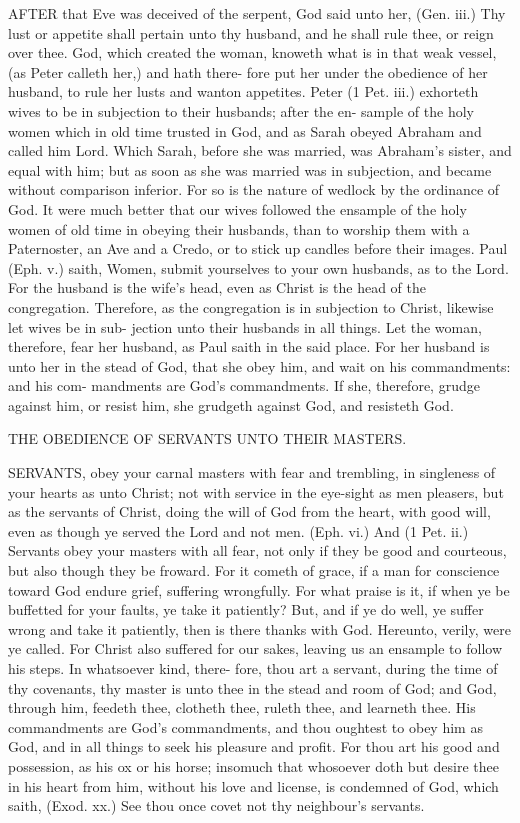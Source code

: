 \documentclass{custom}
\begin{document}
AFTER that Eve was deceived of the serpent, God said 
unto her, (Gen. iii.) Thy lust or appetite shall pertain 
unto thy husband, and he shall rule thee, or reign over
thee. God, which created the woman, knoweth what is
in that weak vessel, (as Peter calleth her,) and hath there- 
fore put her under the obedience of her husband, to rule her 
lusts and wanton appetites. Peter (1 Pet. iii.) exhorteth 
wives to be in subjection to their husbands; after the en- 
sample of the holy women which in old time trusted in 
God, and as Sarah obeyed Abraham and called him 
Lord. Which Sarah, before she was married, was
Abraham's sister, and equal with him; but as 
soon as she was married was in subjection, and became 
without comparison inferior. For so is the nature of 
wedlock by the ordinance of God. It were much better 
that our wives followed the ensample of the holy women of 
old time in obeying their husbands, than to worship them 
with a Paternoster, an Ave and a Credo, or to stick up 
candles before their images. Paul (Eph. v.) saith, Women, 
submit yourselves to your own husbands, as to the
Lord. For the husband is the wife's head, even as Christ is 
the head of the congregation. Therefore, as the congregation 
is in subjection to Christ, likewise let wives be in sub-
jection unto their husbands in all things. Let the woman, 
therefore, fear her husband, as Paul saith in the said place. 
For her husband is unto her in the stead of God, that she 
obey him, and wait on his commandments: and his com- 
mandments are God's commandments. If she, therefore, 
grudge against him, or resist him, she grudgeth against 
God, and resisteth God.


THE OBEDIENCE OF SERVANTS UNTO THEIR 
MASTERS. 

SERVANTS, obey your carnal masters with fear and 
trembling, in singleness of your hearts as unto Christ;
not with service in the eye-sight as men pleasers, but as 
the servants of Christ, doing the will of God from the 
heart, with good will, even as though ye served the Lord 
and not men. (Eph. vi.) And (1 Pet. ii.) Servants obey 
your masters with all fear, not only if they be good and 
courteous, but also though they be froward. For it cometh 
of grace, if a man for conscience toward God endure 
grief, suffering wrongfully. For what praise is it, if when 
ye be buffetted for your faults, ye take it patiently? But, 
and if ye do well, ye suffer wrong and take it patiently, 
then is there thanks with God. Hereunto, verily, were ye 
called. For Christ also suffered for our sakes, leaving us 
an ensample to follow his steps. In whatsoever kind, there- 
fore, thou art a servant, during the time of thy covenants, 
thy master is unto thee in the stead and room of God;
and God, through him, feedeth thee, clotheth thee, ruleth 
thee, and learneth thee. His commandments are God's 
commandments, and thou oughtest to obey him as God, 
and in all things to seek his pleasure and profit. For 
thou art his good and possession, as his ox or his horse;
insomuch that whosoever doth but desire thee in his heart 
from him, without his love and license, is condemned of 
God, which saith, (Exod. xx.) See thou once covet not 
thy neighbour's servants. 
\end{document}
